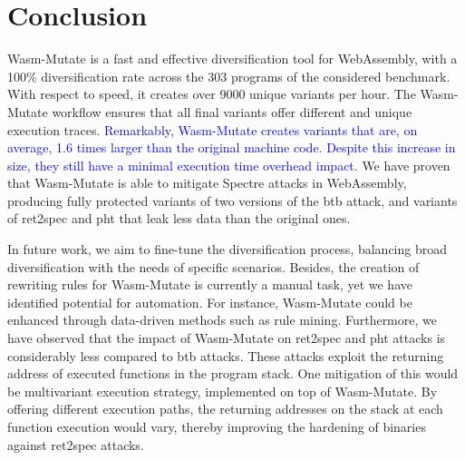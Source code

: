 \documentclass[a4paper,fleqn]{cas-dc}
\newcommand{\tool}{{\sc Wasm-Mutate}\xspace}
\newcommand{\Wasm}{WebAssembly\xspace}
\newcommand{\wasm}{\Wasm}
\newcommand{\revision}[1]{\textcolor{blue}{#1}}
\begin{document}
\section{Conclusion}
\label{conc}

\tool is a fast and effective diversification tool for \wasm, with a 100\% diversification rate across the 303 programs of the considered benchmark. 
With respect to speed, it creates over 9000 unique variants per hour.
The \tool workflow ensures that all final variants offer different and unique execution traces. 
\revision{Remarkably, \tool creates variants that are, on average, 1.6 times larger than the original machine code. 
Despite this increase in size, they still have a minimal execution time overhead impact.}
We have proven that \tool is able to mitigate Spectre attacks in \wasm, producing fully protected variants of two versions of the btb attack, and variants of ret2spec and pht that leak less data than the original ones.


In future work, we aim to fine-tune the diversification process, balancing broad diversification with the needs of specific scenarios. 
Besides, the creation of rewriting rules for \tool is currently a manual task, yet we have identified potential for automation. 
For instance, \tool could be enhanced through data-driven methods such as rule mining.
Furthermore, we have observed that the impact of \tool on ret2spec and pht attacks is considerably less compared to btb attacks. 
These attacks exploit the returning address of executed functions in the program stack. 
One mitigation of this would be multivariant execution strategy, implemented on top of \tool. By offering different execution paths, the returning addresses on the stack at each function execution would vary, thereby improving the hardening of binaries against ret2spec attacks.








\balance
\end{document}
